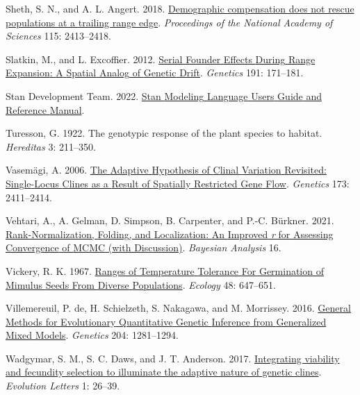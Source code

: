 \documentclass[
  12pt,
]{article}
\newlength{\cslhangindent}
\newlength{\cslentryspacingunit} %
\newenvironment{CSLReferences}[2] %
 {%
  \setlength{\parindent}{0pt}
  \ifodd #1
  \let\oldpar\par
  \def\par{\hangindent=\cslhangindent\oldpar}
  \fi
  \setlength{\parskip}{#2\cslentryspacingunit}
 }%
 {}
\begin{document}
\begin{CSLReferences}{1}{0}
\leavevmode{}%
Sheth, S. N., and A. L. Angert. 2018. \href{https://doi.org/10.1073/pnas.1715899115}{Demographic compensation does not rescue populations at a trailing range edge}. \emph{Proceedings of the National Academy of Sciences} 115: 2413--2418.

\leavevmode{}%
Slatkin, M., and L. Excoffier. 2012. \href{https://doi.org/10.1534/genetics.112.139022}{Serial {Founder} {Effects} {During} {Range} {Expansion}: {A} {Spatial} {Analog} of {Genetic} {Drift}}. \emph{Genetics} 191: 171--181.

\leavevmode{}%
Stan Development Team. 2022. \href{https://mc-stan.org}{Stan {Modeling} {Language} {Users} {Guide} and {Reference} {Manual}}.

\leavevmode{}%
Turesson, G. 1922. The genotypic response of the plant species to habitat. \emph{Hereditas} 3: 211--350.

\leavevmode{}%
Vasemägi, A. 2006. \href{https://doi.org/10.1534/genetics.106.059881}{The {Adaptive} {Hypothesis} of {Clinal} {Variation} {Revisited}: {Single}-{Locus} {Clines} as a {Result} of {Spatially} {Restricted} {Gene} {Flow}}. \emph{Genetics} 173: 2411--2414.

\leavevmode{}%
Vehtari, A., A. Gelman, D. Simpson, B. Carpenter, and P.-C. Bürkner. 2021. \href{https://doi.org/10.1214/20-BA1221}{Rank-{Normalization}, {Folding}, and {Localization}: {An} {Improved} \emph{r} for {Assessing} {Convergence} of {MCMC} (with {Discussion})}. \emph{Bayesian Analysis} 16.

\leavevmode{}%
Vickery, R. K. 1967. \href{https://doi.org/10.2307/1936508}{Ranges of {Temperature} {Tolerance} {For} {Germination} of {Mimulus} {Seeds} {From} {Diverse} {Populations}}. \emph{Ecology} 48: 647--651.

\leavevmode{}%
Villemereuil, P. de, H. Schielzeth, S. Nakagawa, and M. Morrissey. 2016. \href{https://doi.org/10.1534/genetics.115.186536}{General {Methods} for {Evolutionary} {Quantitative} {Genetic} {Inference} from {Generalized} {Mixed} {Models}}. \emph{Genetics} 204: 1281--1294.

\leavevmode{}%
Wadgymar, S. M., S. C. Daws, and J. T. Anderson. 2017. \href{https://doi.org/10.1002/evl3.3}{Integrating viability and fecundity selection to illuminate the adaptive nature of genetic clines}. \emph{Evolution Letters} 1: 26--39.


\end{CSLReferences}
\end{document}
